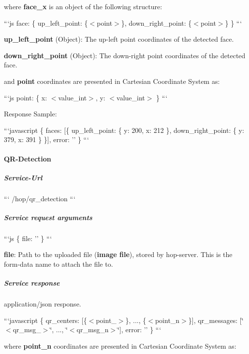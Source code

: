 where {\bfseries face\-\_\-x} is an object of the following structure\-:

```js face\-: \{ up\-\_\-left\-\_\-point\-: \{$<$point$>$\}, down\-\_\-right\-\_\-point\-: \{$<$point$>$\} \} ```


\begin{DoxyItemize}
\item {\bfseries up\-\_\-left\-\_\-point} (Object)\-: The up-\/left point coordinates of the detected face.
\item {\bfseries down\-\_\-right\-\_\-point} (Object)\-: The down-\/right point coordinates of the detected face.
\end{DoxyItemize}

and {\bfseries point} coordinates are presented in Cartesian Coordinate System as\-:

```js point\-: \{ x\-: $<$value\-\_\-int$>$, y\-: $<$value\-\_\-int$>$ \} ```

Response Sample\-:

```javascript \{ faces\-: \mbox{[}\{ up\-\_\-left\-\_\-point\-: \{ y\-: 200, x\-: 212 \}, down\-\_\-right\-\_\-point\-: \{ y\-: 379, x\-: 391 \} \}\mbox{]}, error\-: '' \} ```

\paragraph*{Q\-R-\/\-Detection}

\subparagraph*{Service-\/\-Url}

``` /hop/qr\-\_\-detection ```

\subparagraph*{Service request arguments}

```js \{ file\-: '' \} ```


\begin{DoxyItemize}
\item {\bfseries file}\-: Path to the uploaded file ({\bfseries image file}), stored by hop-\/server. This is the form-\/data name to attach the file to.
\end{DoxyItemize}

\subparagraph*{Service response}

application/json response.

```javascript \{ qr\-\_\-centers\-: \mbox{[}\{$<$point\-\_$>$\}, ..., \{$<$point\-\_\-n$>$\}\mbox{]}, qr\-\_\-messages\-: \mbox{[}\char`\"{}$<$qr\-\_\-msg\-\_$>$\char`\"{}, ..., \char`\"{}$<$qr\-\_\-msg\-\_\-n$>$\char`\"{}\mbox{]}, error\-: '' \} ```

where {\bfseries point\-\_\-n} coordinates are presented in Cartesian Coordinate System as\-:

